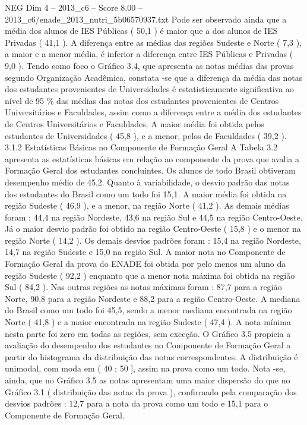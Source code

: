 \begin{textsample}{NEG Dim 4 – 2013\_c6 – Score 8.00 – 2013\_c6/enade\_2013\_nutri\_5b06570937.txt}
Pode ser observado ainda que a média dos alunos de IES Públicas ( 50,1 ) é maior que a dos alunos de IES Privadas ( 41,1 ).
A diferença entre as médias das regiões Sudeste e Norte ( 7,3 ), a maior e a menor média, é inferior a diferença entre IES Públicas e Privadas ( 9,0 ).
Tendo como foco o Gráfico 3.4, que apresenta as notas médias das provas segundo Organização Acadêmica, constata -se que a diferença da média das notas dos estudantes provenientes de Universidades é estatisticamente significativa ao nível de 95 \% das médias das notas dos estudantes provenientes de Centros Universitários e Faculdades, assim como a diferença entre a média dos estudantes de Centros Universitários e Faculdades.
A maior média foi obtida pelos estudantes de Universidades ( 45,8 ), e a menor, pelos de Faculdades ( 39,2 ). 3.1.2 Estatísticas Básicas no Componente de Formação Geral A Tabela 3.2 apresenta as estatísticas básicas em relação ao componente da prova que avalia a Formação Geral dos estudantes concluintes.
Os alunos de todo Brasil obtiveram desempenho médio de 45,2.
Quanto à variabilidade, o desvio padrão das notas dos estudantes do Brasil como um todo foi 15,1.
A maior média foi obtida na região Sudeste ( 46,9 ), e a menor, na região Norte ( 41,2 ).
As demais médias foram : 44,4 na região Nordeste, 43,6 na região Sul e 44,5 na região Centro-Oeste.
Já o maior desvio padrão foi obtido na região Centro-Oeste ( 15,8 ) e o menor na região Norte ( 14,2 ).
Os demais desvios padrões foram : 15,4 na região Nordeste, 14,7 na região Sudeste e 15,0 na região Sul.
A maior nota no Componente de Formação Geral da prova do ENADE foi obtida por pelo menos um aluno da região Sudeste ( 92,2 ) enquanto que a menor nota máxima foi obtida na região Sul ( 84,2 ).
Nas outras regiões as notas máximas foram : 87,7 para a região Norte, 90,8 para a região Nordeste e 88,2 para a região Centro-Oeste.
A mediana do Brasil como um todo foi 45,5, sendo a menor mediana encontrada na região Norte ( 41,8 ) e a maior encontrada na região Sudeste ( 47,4 ).
A nota mínima nesta parte foi zero em todas as regiões, sem exceção.
O Gráfico 3.5 propicia a avaliação do desempenho dos estudantes no Componente de Formação Geral a partir do histograma da distribuição das notas correspondentes.
A distribuição é unimodal, com moda em ( 40 ; 50 ], assim na prova como um todo.
Nota -se, ainda, que no Gráfico 3.5 as notas apresentam uma maior dispersão do que no Gráfico 3.1 ( distribuição das notas da prova ), confirmado pela comparação dos desvios padrões : 12,7 para a nota da prova como um todo e 15,1 para o Componente de Formação Geral.

\end{textsample}
